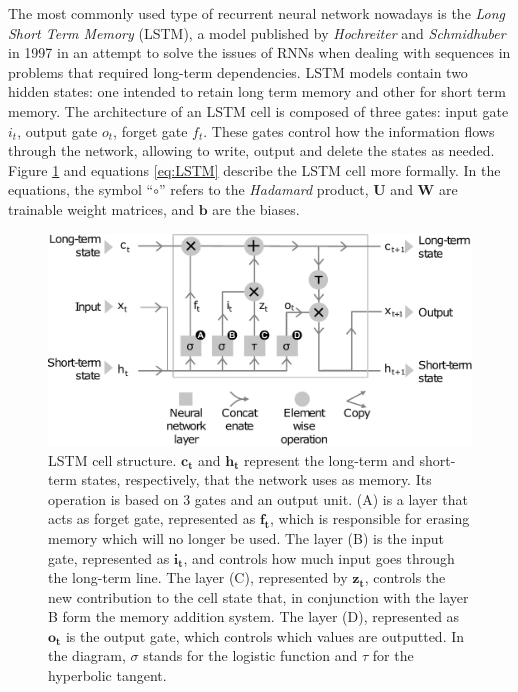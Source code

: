 The most commonly used type of recurrent neural network nowadays is the \textit{Long Short Term Memory} (LSTM), a model published by  \textit{Hochreiter} and \textit{Schmidhuber} in 1997 \autocite{Schmidhuber1997} in an attempt to solve the issues of RNNs when dealing with sequences in problems that required long-term dependencies. LSTM models contain two hidden states: one intended to retain long term memory and other for short term memory. The architecture of an LSTM cell is composed of three gates: input gate $i_t$, output gate $o_t$, forget gate $f_t$. These gates control how the information flows through the network, allowing to write, output and delete the states as needed. Figure \ref{fig:lstm} and equations \ref{eq:LSTM} describe the LSTM cell more formally. In the equations, the symbol ``$\circ$'' refers to the \textit{Hadamard} product, $\mathbf{U}$ and $\mathbf{W}$ are trainable weight matrices, and $\mathbf{b}$ are the biases.

\begin{figure}
	\centering
	\includegraphics[width=0.7\linewidth]{chapter2/images/LSTM}
	\caption{LSTM cell structure. $\mathbf{c_t}$ and $\mathbf{h_t}$ represent the long-term and short-term states, respectively, that the network uses as memory. Its operation is based on 3 gates and an output unit. (A) is a layer that acts as forget gate, represented as $\mathbf{f_t}$, which is responsible for erasing memory which will no longer be used. The layer (B) is the input gate, represented as $\mathbf{i_t}$, and controls how much input goes through the long-term line. The layer (C), represented by $\mathbf{z_t}$, controls the new contribution to the cell state that, in conjunction with the layer B form the memory addition system. The layer (D), represented as $\mathbf{o_t}$ is the output gate, which controls which values are outputted. In the diagram, $\sigma$ stands for the logistic function and $\tau$ for the hyperbolic tangent.}
	\label{fig:lstm}
\end{figure}



